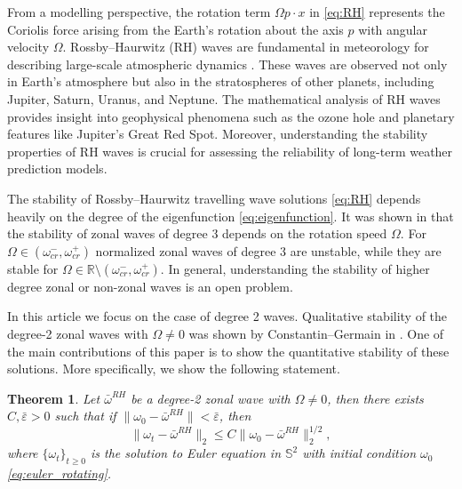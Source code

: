 \documentclass{amsart}
\newtheorem{theorem}{Theorem}[lemma]
\newtheorem{theorem}[lemma]{Theorem}  %
\def\R{{\mathbb{R}}}
\def\esse{{\mathbb{S}}}
\def\eps{{\varepsilon}}
\begin{document}
From a modelling perspective, the rotation term $\Omega p\cdot x$ in \eqref{eq:RH} represents the Coriolis force arising from the Earth's rotation about the axis $p$ with angular velocity $\Omega$. Rossby--Haurwitz (RH) waves are fundamental in meteorology for describing large-scale atmospheric dynamics \cite{holton2012}. These waves are observed not only in Earth's atmosphere but also in the stratospheres of other planets, including Jupiter, Saturn, Uranus, and Neptune. The mathematical analysis of RH waves provides insight into geophysical phenomena such as the ozone hole and planetary features like Jupiter’s Great Red Spot. Moreover, understanding the stability properties of RH waves is crucial for assessing the reliability of long-term weather prediction models.

The stability of Rossby--Haurwitz travelling wave solutions \eqref{eq:RH} depends heavily on the degree of the eigenfunction \eqref{eq:eigenfunction}. It was shown in \cite{constantin2025onsetinstabilityzonalstratospheric} that the stability of zonal waves of degree 3 depends on the rotation speed $\Omega$. For $\Omega\in(\omega_{cr}^-,\omega_{cr}^+)$ normalized zonal waves of degree 3 are unstable, while they are stable for $\Omega\in \R\setminus (\omega_{cr}^-,\omega_{cr}^+)$. In general, understanding the stability of higher degree zonal or non-zonal waves is an open problem.

In this article we focus on the case of degree 2 waves. Qualitative stability of the degree-2 zonal waves with $\Omega\ne 0$ was shown by Constantin--Germain in \cite{Costantin2022}. One of the main contributions of this paper is to show the quantitative stability of these solutions. More specifically, we show the following statement. 
\begin{theorem}\label{thm:1}
Let $\bar\omega^{RH}$ be a degree-2 zonal wave with $\Omega\ne 0$, then there exists $C, \bar\eps>0$ such that if $\|\omega_0-\bar{\omega}^{RH}\|<\bar\eps$, then 
\begin{equation}\label{eq:1ststability}
    \|\omega_t-\bar{\omega}^{RH}\|_2\leq C \|\omega_0-\bar{\omega}^{RH}\|^{1/2}_2,
\end{equation}
where $\{\omega_t\}_{t\ge 0}$ is the solution to Euler equation in $\esse^2$ with initial condition $\omega_0$ \eqref{eq:euler_rotating}.
\end{theorem}
\end{document}
